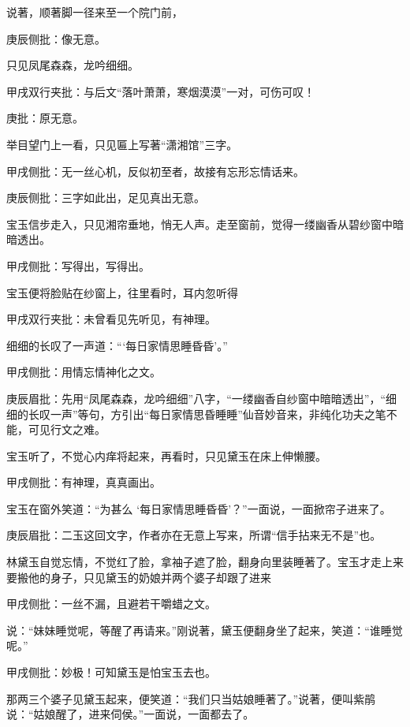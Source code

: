 \begin{parag}
    说著，顺著脚一径来至一个院门前，\begin{note}庚辰侧批：像无意。\end{note}只见凤尾森森，龙吟细细。\begin{note}甲戌双行夹批：与后文“落叶萧萧，寒烟漠漠”一对，可伤可叹！\end{note}\begin{note}庚批：原无意。\end{note}举目望门上一看，只见匾上写著“潇湘馆”三字。\begin{note}甲戌侧批：无一丝心机，反似初至者，故接有忘形忘情话来。\end{note}\begin{note}庚辰侧批：三字如此出，足见真出无意。\end{note}宝玉信步走入，只见湘帘垂地，悄无人声。走至窗前，觉得一缕幽香从碧纱窗中暗暗透出。\begin{note}甲戌侧批：写得出，写得出。\end{note}宝玉便将脸贴在纱窗上，往里看时，耳内忽听得\begin{note}甲戌双行夹批：未曾看见先听见，有神理。\end{note}细细的长叹了一声道：“‘每日家情思睡昏昏’。”\begin{note}甲戌侧批：用情忘情神化之文。\end{note}\begin{note}庚辰眉批：先用“凤尾森森，龙吟细细”八字，“一缕幽香自纱窗中暗暗透出”，“细细的长叹一声”等句，方引出“每日家情思昏睡睡”仙音妙音来，非纯化功夫之笔不能，可见行文之难。\end{note}宝玉听了，不觉心内痒将起来，再看时，只见黛玉在床上伸懒腰。\begin{note}甲戌侧批：有神理，真真画出。\end{note}宝玉在窗外笑道：“为甚么 ‘每日家情思睡昏昏’？”一面说，一面掀帘子进来了。\begin{note}庚辰眉批：二玉这回文字，作者亦在无意上写来，所谓“信手拈来无不是”也。\end{note}
\end{parag}


\begin{parag}
    林黛玉自觉忘情，不觉红了脸，拿袖子遮了脸，翻身向里装睡著了。宝玉才走上来要搬他的身子，只见黛玉的奶娘并两个婆子却跟了进来\begin{note}甲戌侧批：一丝不漏，且避若干嚼蜡之文。\end{note}说：“妹妹睡觉呢，等醒了再请来。”刚说著，黛玉便翻身坐了起来，笑道：“谁睡觉呢。”\begin{note}甲戌侧批：妙极！可知黛玉是怕宝玉去也。\end{note}那两三个婆子见黛玉起来，便笑道：“我们只当姑娘睡著了。”说著，便叫紫鹃说：“姑娘醒了，进来伺侯。”一面说，一面都去了。
\end{parag}


